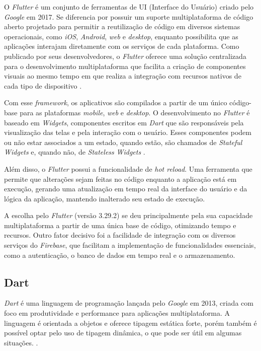 O \textit{Flutter} é um conjunto de ferramentas de UI (Interface do Usuário) criado 
pelo \textit{Google} em 2017. Se diferencia por possuir um suporte multiplataforma de código aberto 
projetado para permitir a reutilização de código em diversos sistemas operacionais, como \textit{iOS}, 
\textit{Android}, \textit{web} e \textit{desktop}, enquanto possibilita que as aplicações interajam 
diretamente com os serviços de cada plataforma. Como publicado por seus desenvolvedores, 
o \textit{Flutter} oferece 
uma solução centralizada para o desenvolvimento multiplataforma que facilita a criação de 
componentes visuais ao mesmo tempo em que realiza a integração com recursos nativos de cada tipo 
de dispositivo \cite{flutterDocs2025}.

Com esse \textit{framework}, os aplicativos são compilados a partir de um único código-base para as 
plataformas \textit{mobile}, \textit{web} e \textit{desktop}. O desenvolvimento no \textit{Flutter} é baseado em \textit{Widgets}, 
componentes escritos em \textit{Dart} que são responsáveis pela visualização das telas e pela interação 
com o usuário.
Esses componentes podem ou não estar associados a um estado, quando estão, são chamados de \textit{Stateful} 
\textit{Widgets} e, quando não, de \textit{Stateless} \textit{Widgets} \cite{flutterDocs2025}.

Além disso, o \textit{Flutter} possui a funcionalidade de \textit{hot reload}. 
Uma ferramenta que permite que alterações sejam feitas no código 
enquanto a aplicação está em execução, gerando uma 
atualização em tempo real da interface do usuário e da lógica da aplicação, 
mantendo inalterado seu estado de execução.

A escolha pelo \textit{Flutter} (versão 3.29.2) se deu principalmente pela sua capacidade multiplataforma a partir de 
uma única base de código, otimizando tempo e recursos. Outro fator decisivo foi a 
facilidade de integração com os diversos serviços do \textit{Firebase}, 
que facilitam a implementação de funcionalidades essenciais,  
como a autenticação, o banco de dados em tempo real e o armazenamento.

\subsection{Dart}

\textit{Dart} é uma linguagem de programação lançada pelo \textit{Google} em 2013, criada com foco em produtividade e 
performance para aplicações multiplataforma. A linguagem é orientada a objetos e oferece tipagem 
estática forte, porém também é possível optar pelo uso de tipagem dinâmica, 
o que pode ser útil em algumas situações. \cite{dartDocs2025}.

